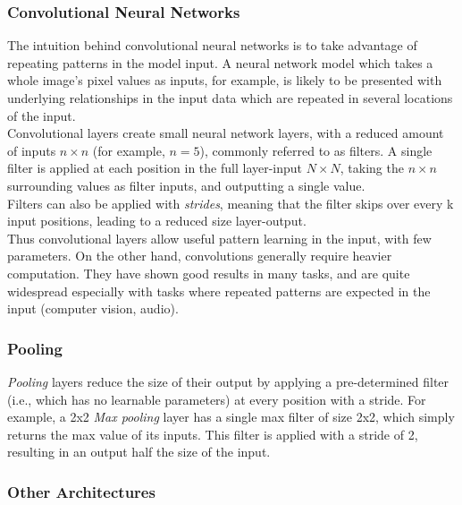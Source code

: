 \subsubsection{Convolutional Neural Networks}

The intuition behind convolutional neural networks is to take advantage of repeating patterns in the model input. A neural network model which takes a whole image's pixel values as inputs, for example, is likely to be presented with underlying relationships in the input data which are repeated in several locations of the input.\\

Convolutional layers create small neural network layers, with a reduced amount of inputs $n\times n$ (for example, $n = 5$), commonly referred to as filters. A single filter is applied at each position in the full layer-input $N\times N$, taking the $n\times n$ surrounding values as filter inputs, and outputting a single value.\\

Filters can also be applied with \textit{strides}, meaning that the filter skips over every k input positions, leading to a reduced size layer-output.\\

Thus convolutional layers allow useful pattern learning in the input, with few parameters. On the other hand, convolutions generally require heavier computation. They have shown good results in many tasks, and are quite widespread especially with tasks where repeated patterns are expected in the input (computer vision, audio).\\

\subsubsection{Pooling}

\textit{Pooling} layers reduce the size of their output by applying a pre-determined filter (i.e., which has no learnable parameters) at every position with a stride. For example, a 2x2 \textit{Max pooling} layer has a single max filter of size 2x2, which simply returns the max value of its inputs. This filter is applied with a stride of 2, resulting in an output half the size of the input.\\

\subsubsection{Other Architectures}

